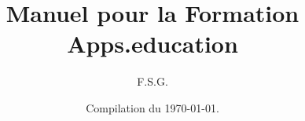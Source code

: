\documentclass[a4paper, 11pt]{book}
\title{Manuel pour la Formation\\ Apps.education}
\author{F.S.G.}
\date{Compilation du \today{}.}
\renewcommand{\baselinestretch}{1.25}
\begin{document}
\begin{titlepage}
    \maketitle
\end{titlepage}















\newpage
\renewcommand{\baselinestretch}{1}
\setlength{\parskip}{0em}
\tableofcontents
\end{document}
